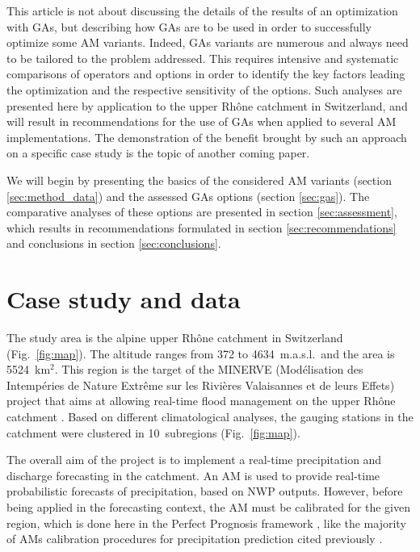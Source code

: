 \documentclass{ametsoc}
\begin{document}
This article is not about discussing the details of the results of an optimization with GAs, but describing how GAs are to be used in order to successfully optimize some AM variants. Indeed, GAs variants are numerous and always need to be tailored to the problem addressed. This requires intensive and systematic comparisons of operators and options in order to identify the key factors leading the optimization and the respective sensitivity of the options. Such analyses are presented here by application to the upper Rh\^{o}ne catchment in Switzerland, and will result in recommendations for the use of GAs when applied to several AM implementations. The demonstration of the benefit brought by such an approach on a specific case study is the topic of another coming paper. 

We will begin by presenting the basics of the considered AM variants (section \ref{sec:method_data}) and the assessed GAs options (section \ref{sec:gas}). The comparative analyses of these options are presented in section \ref{sec:assessment}, which results in recommendations formulated in section \ref{sec:recommendations} and conclusions in section \ref{sec:conclusions}.


\section{Case study and data}
\label{sec:case_study_data}

The study area is the alpine upper Rh\^{o}ne catchment in Switzerland (Fig.\ \ref{fig:map}). The altitude ranges from 372 to 4634~m.a.s.l.\ and the area is 5524~km$^{2}$. This region is the target of the MINERVE (Mod\'{e}lisation des Intemp\'{e}ries de Nature Extr\^{e}me sur les Rivi\`{e}res Valaisannes et de leurs Effets) project that aims at allowing real-time flood management on the upper Rh\^{o}ne catchment \citep{GarciaHernandez2009b}. Based on different climatological analyses, the gauging stations in the catchment were clustered in 10~subregions (Fig.\ \ref{fig:map}).

The overall aim of the project is to implement a real-time precipitation and discharge forecasting in the catchment. An AM is used to provide real-time probabilistic forecasts of precipitation, based on NWP outputs. However, before being applied in the forecasting context, the AM must be calibrated for the given region, which is done here in the Perfect Prognosis framework \citep{Klein1963}, like the majority of AMs calibration procedures for precipitation prediction cited previously \cite[with the exception of][]{Hamill2006,Hamill2015b}.
\end{document}
